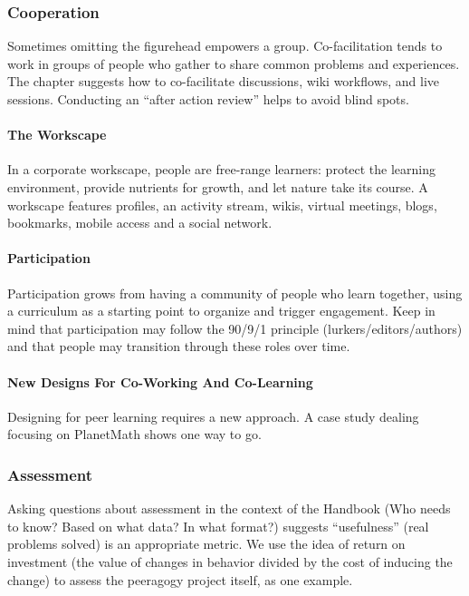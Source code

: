 \subsubsection{Cooperation}

\noindent Sometimes omitting the figurehead empowers a
group. Co-facilitation tends to work in groups of people who gather to
share common problems and experiences. The chapter suggests how to
co-facilitate discussions, wiki workflows, and live
sessions. Conducting an ``after action review'' helps to avoid blind
spots.

\paragraph{The Workscape} In a corporate workscape, people are free-range
learners: protect the learning environment, provide nutrients for
growth, and let nature take its course. A workscape features profiles,
an activity stream, wikis, virtual meetings, blogs, bookmarks, mobile
access and a social network.

\paragraph{Participation} Participation grows from having a
community of people who learn together, using a curriculum as a starting
point to organize and trigger engagement. Keep in mind that
participation may follow the 90/9/1 principle (lurkers/editors/authors)
and that people may transition through these roles over time.

\paragraph{New Designs For Co-Working And Co-Learning} Designing for
peer learning requires a new approach.  A case study dealing focusing
on PlanetMath shows one way to go.

\subsubsection{Assessment}

\noindent Asking questions about assessment in the context of the
Handbook (Who needs to know? Based on what data? In what format?)
suggests ``usefulness'' (real problems solved) is an appropriate
metric. We use the idea of return on investment (the value of changes
in behavior divided by the cost of inducing the change) to assess the
peeragogy project itself, as one example.

